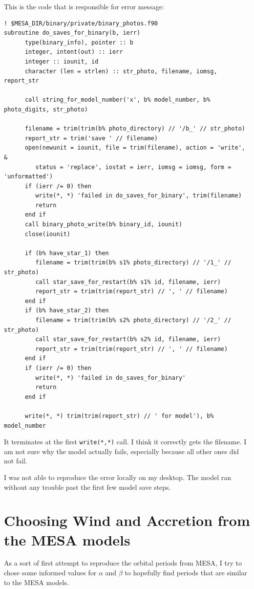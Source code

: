 \documentclass[a4paper,10pt]{article}
\begin{document}
This is the code that is responsible for error message:
\begin{verbatim}
! $MESA_DIR/binary/private/binary_photos.f90
subroutine do_saves_for_binary(b, ierr)
      type(binary_info), pointer :: b
      integer, intent(out) :: ierr
      integer :: iounit, id
      character (len = strlen) :: str_photo, filename, iomsg, report_str

      call string_for_model_number('x', b% model_number, b% photo_digits, str_photo)

      filename = trim(trim(b% photo_directory) // '/b_' // str_photo)
      report_str = trim('save ' // filename)
      open(newunit = iounit, file = trim(filename), action = 'write', &
         status = 'replace', iostat = ierr, iomsg = iomsg, form = 'unformatted')
      if (ierr /= 0) then
         write(*, *) 'failed in do_saves_for_binary', trim(filename)
         return
      end if
      call binary_photo_write(b% binary_id, iounit)
      close(iounit)

      if (b% have_star_1) then
         filename = trim(trim(b% s1% photo_directory) // '/1_' // str_photo)
         call star_save_for_restart(b% s1% id, filename, ierr)
         report_str = trim(trim(report_str) // ', ' // filename)
      end if
      if (b% have_star_2) then
         filename = trim(trim(b% s2% photo_directory) // '/2_' // str_photo)
         call star_save_for_restart(b% s2% id, filename, ierr)
         report_str = trim(trim(report_str) // ', ' // filename)
      end if
      if (ierr /= 0) then
         write(*, *) 'failed in do_saves_for_binary'
         return
      end if

      write(*, *) trim(trim(report_str) // ' for model'), b% model_number
\end{verbatim}

It terminates at the first \lstinline[style=output, breaklines=true]|write(*,*)| call. I think it correctly gets the filename. I am not sure why the model actually fails, especially because all other ones did not fail.

I was not able to reproduce the error locally on my desktop. The model ran without any trouble past the first few model save steps.

\section{Choosing Wind and Accretion from the MESA models}

As a sort of first attempt to reproduce the orbital periods from MESA, I try to chose some informed values for \(\alpha \) and \(\beta \) to hopefully find periods that are similar to the MESA models.
\end{document}
